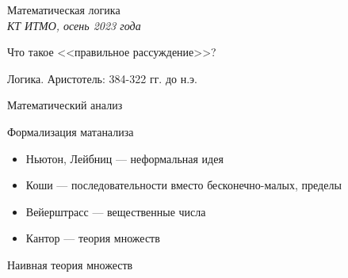 \documentclass[handout]{beamer}
\begin{document}
\newtheorem{axiom}{Аксиома}
\newtheorem{exmprus}{Пример}
\newtheorem{defrus}{Определение}
\newtheorem{lemmarus}{Лемма}
\newtheorem{thmrus}{Лемма}

\begin{frame}{}
\begin{center}{\Large Математическая логика}\\\itshape{КТ ИТМО, осень 2023 года}\end{center}
\end{frame}

\begin{frame}{Что такое <<правильное рассуждение>>?}
\end{frame}

\begin{frame}{Логика. Аристотель: 384-322 гг. до н.э.}
\end{frame}

\begin{frame}{Математический анализ}
\end{frame}

\begin{frame}{Формализация матанализа}
\begin{itemize}
\item Ньютон, Лейбниц --- неформальная идея
\vspace{1cm}
\item Коши --- последовательности вместо бесконечно-малых, пределы
\vspace{1cm}
\item Вейерштрасс --- вещественные числа
\vspace{1cm}
\item Кантор --- теория множеств
\end{itemize}
\end{frame}

%
\begin{frame}{Наивная теория множеств}
\end{frame}
\end{document}

